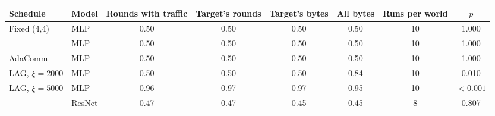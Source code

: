 \begin{tabular}{@{}llcccccc@{}}
\toprule
Schedule & Model & Rounds with traffic & Target's rounds & Target's bytes & All bytes & Runs per world & $p$\\
\midrule
Fixed (4,4) & MLP & 0.50 & 0.50 & 0.50 & 0.50 & 10 & 1.000\\
\tierfed{} & MLP & 0.50 & 0.50 & 0.50 & 0.50 & 10 & 1.000\\
AdaComm & MLP & 0.50 & 0.50 & 0.50 & 0.50 & 10 & 1.000\\
LAG, $\xi=2000$ & MLP & 0.50 & 0.50 & 0.50 & 0.84 & 10 & 0.010\\
LAG, $\xi=5000$ & MLP & 0.96 & 0.97 & 0.97 & 0.95 & 10 & $<0.001$\\
\midrule
\tierfed{} & ResNet & 0.47 & 0.47 & 0.45 & 0.45 & 8 & 0.807\\
\bottomrule
\end{tabular}
